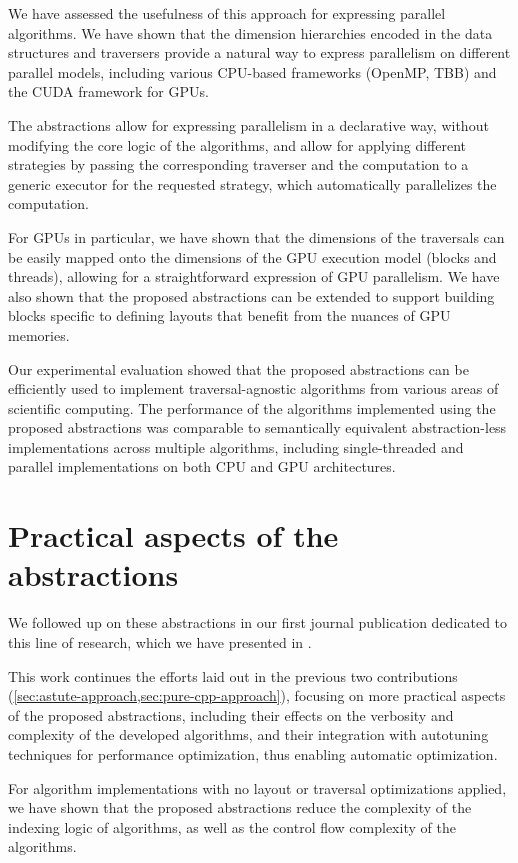 We have assessed the usefulness of this approach for expressing parallel algorithms. We have shown that the dimension hierarchies encoded in the data structures and traversers provide a natural way to express parallelism on different parallel models, including various CPU-based frameworks (OpenMP, TBB) and the CUDA framework for GPUs.

The abstractions allow for expressing parallelism in a declarative way, without modifying the core logic of the algorithms, and allow for applying different strategies by passing the corresponding traverser and the computation to a generic executor for the requested strategy, which automatically parallelizes the computation.

For GPUs in particular, we have shown that the dimensions of the traversals can be easily mapped onto the dimensions of the GPU execution model (blocks and threads), allowing for a straightforward expression of GPU parallelism. We have also shown that the proposed abstractions can be extended to support building blocks specific to defining layouts that benefit from the nuances of GPU memories.

Our experimental evaluation showed that the proposed abstractions can be efficiently used to implement traversal-agnostic algorithms from various areas of scientific computing.
The performance of the algorithms implemented using the proposed abstractions was comparable to semantically equivalent abstraction-less implementations across multiple algorithms, including single-threaded and parallel implementations on both CPU and GPU architectures.


\section{Practical aspects of the abstractions}\label{sec:cpp-abstractions}

We followed up on these abstractions in our first journal publication dedicated to this line of research, which we have presented in .

This work continues the efforts laid out in the previous two contributions (\cref{sec:astute-approach,sec:pure-cpp-approach}), focusing on more practical aspects of the proposed abstractions, including their effects on the verbosity and complexity of the developed algorithms, and their integration with autotuning techniques for performance optimization, thus enabling automatic optimization.

For algorithm implementations with no layout or traversal optimizations applied, we have shown that the proposed abstractions reduce the complexity of the indexing logic of algorithms, as well as the control flow complexity of the algorithms.


